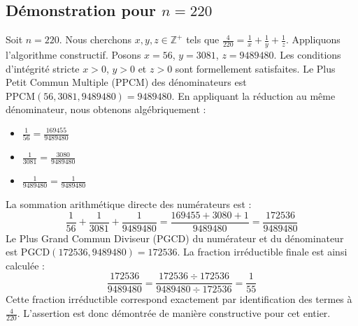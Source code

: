 \documentclass[11pt,a4paper]{article}
\begin{document}
\subsection{Démonstration pour $n = 220$}
Soit $n = 220$. Nous cherchons $x, y, z \in \mathbb{Z}^{+}$ tels que $\frac{4}{220} = \frac{1}{x} + \frac{1}{y} + \frac{1}{z}$.
Appliquons l'algorithme constructif. Posons $x = 56$, $y = 3081$, $z = 9489480$.
Les conditions d'intégrité stricte $x > 0$, $y > 0$ et $z > 0$ sont formellement satisfaites.
Le Plus Petit Commun Multiple (PPCM) des dénominateurs est $\text{PPCM}(56, 3081, 9489480) = 9489480$.
En appliquant la réduction au même dénominateur, nous obtenons algébriquement :
\begin{itemize}
    \item $\frac{1}{56} = \frac{169455}{9489480}$
    \item $\frac{1}{3081} = \frac{3080}{9489480}$
    \item $\frac{1}{9489480} = \frac{1}{9489480}$
\end{itemize}
La sommation arithmétique directe des numérateurs est :
$$ \frac{1}{56} + \frac{1}{3081} + \frac{1}{9489480} = \frac{169455 + 3080 + 1}{9489480} = \frac{172536}{9489480} $$
Le Plus Grand Commun Diviseur (PGCD) du numérateur et du dénominateur est $\text{PGCD}(172536, 9489480) = 172536$.
La fraction irréductible finale est ainsi calculée :
$$ \frac{172536}{9489480} = \frac{172536 \div 172536}{9489480 \div 172536} = \frac{1}{55} $$
Cette fraction irréductible correspond exactement par identification des termes à $\frac{4}{220}$. L'assertion est donc démontrée de manière constructive pour cet entier.
\end{document}
